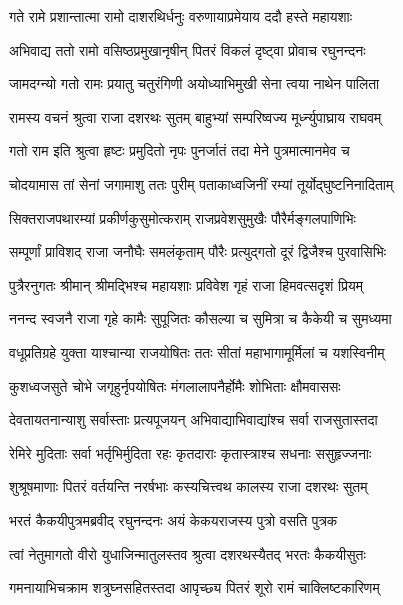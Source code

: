 
\twolineshloka
{गते रामे प्रशान्तात्मा रामो दाशरथिर्धनुः}
{वरुणायाप्रमेयाय ददौ हस्ते महायशाः} %

\twolineshloka
{अभिवाद्य ततो रामो वसिष्ठप्रमुखानृषीन्}
{पितरं विकलं दृष्ट्वा प्रोवाच रघुनन्दनः} %

\twolineshloka
{जामदग्न्यो गतो रामः प्रयातु चतुरंगिणी}
{अयोध्याभिमुखी सेना त्वया नाथेन पालिता} %

\twolineshloka
{रामस्य वचनं श्रुत्वा राजा दशरथः सुतम्}
{बाहुभ्यां सम्परिष्वज्य मूर्ध्न्युपाघ्राय राघवम्} %

\twolineshloka
{गतो राम इति श्रुत्वा हृष्टः प्रमुदितो नृपः}
{पुनर्जातं तदा मेने पुत्रमात्मानमेव च} %

\twolineshloka
{चोदयामास तां सेनां जगामाशु ततः पुरीम्}
{पताकाध्वजिनीं रम्यां तूर्योद्घुष्टनिनादिताम्} %

\twolineshloka
{सिक्तराजपथारम्यां प्रकीर्णकुसुमोत्कराम्}
{राजप्रवेशसुमुखैः पौरैर्मङ्गलपाणिभिः} %

\twolineshloka
{सम्पूर्णां प्राविशद् राजा जनौघैः समलंकृताम्}
{पौरैः प्रत्युद्गतो दूरं द्विजैश्च पुरवासिभिः} %

\twolineshloka
{पुत्रैरनुगतः श्रीमान् श्रीमद्भिश्च महायशाः}
{प्रविवेश गृहं राजा हिमवत्सदृशं प्रियम्} %

\twolineshloka
{ननन्द स्वजनै राजा गृहे कामैः सुपूजितः}
{कौसल्या च सुमित्रा च कैकेयी च सुमध्यमा} %

\twolineshloka
{वधूप्रतिग्रहे युक्ता याश्चान्या राजयोषितः}
{ततः सीतां महाभागामूर्मिलां च यशस्विनीम्} %

\twolineshloka
{कुशध्वजसुते चोभे जगृहुर्नृपयोषितः}
{मंगलालापनैर्होमैः शोभिताः क्षौमवाससः} %

\twolineshloka
{देवतायतनान्याशु सर्वास्ताः प्रत्यपूजयन्}
{अभिवाद्याभिवाद्यांश्च सर्वा राजसुतास्तदा} %

\twolineshloka
{रेमिरे मुदिताः सर्वा भर्तृभिर्मुदिता रहः}
{कृतदाराः कृतास्त्राश्च सधनाः ससुहृज्जनाः} %

\twolineshloka
{शुश्रूषमाणाः पितरं वर्तयन्ति नरर्षभाः}
{कस्यचित्त्वथ कालस्य राजा दशरथः सुतम्} %

\twolineshloka
{भरतं कैकयीपुत्रमब्रवीद् रघुनन्दनः}
{अयं केकयराजस्य पुत्रो वसति पुत्रक} %

\twolineshloka
{त्वां नेतुमागतो वीरो युधाजिन्मातुलस्तव}
{श्रुत्वा दशरथस्यैतद् भरतः कैकयीसुतः} %

\twolineshloka
{गमनायाभिचक्राम शत्रुघ्नसहितस्तदा}
{आपृच्छ्य पितरं शूरो रामं चाक्लिष्टकारिणम्} %

